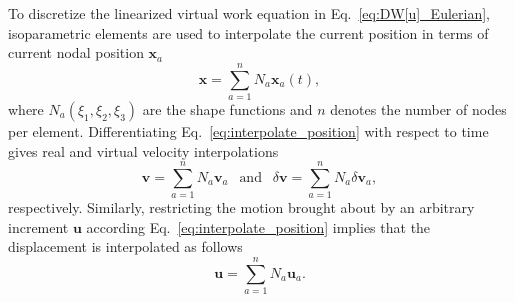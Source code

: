 \documentclass[12pt,aps,pre]{revtex4}
\begin{document}
To discretize the linearized virtual work equation in Eq.\ \eqref{eq:DW[u]_Eulerian}, isoparametric elements are used to interpolate the current position in terms of current nodal position $\pmb{x}_a$
%
\begin{equation}
\pmb{x} = \sum_{a=1}^n N_a \pmb{x}_a(t),
\label{eq:interpolate_position}
\end{equation}
% 
where $N_a(\xi_1,\xi_2,\xi_3)$ are the shape functions and $n$ denotes the number of nodes per element. Differentiating Eq.\ \eqref{eq:interpolate_position} with respect to time gives real and virtual velocity interpolations
%
\begin{equation}
\pmb{v} = \sum_{a=1}^n N_a \pmb{v}_a \ \ \text{ and } \ \ \delta \pmb{v} = \sum_{a=1}^n N_a \delta \pmb{v}_a,
\label{eq:interpolate_velocity}
\end{equation}
%
respectively.  Similarly, restricting the motion brought about by an arbitrary increment $\pmb{u}$ according Eq.\ \eqref{eq:interpolate_position} implies that the displacement is interpolated as follows
%
\begin{equation}
\pmb{u} = \sum_{a=1}^n N_a \pmb{u}_a.
\label{eq:interpolate_displacement}
\end{equation}
%
\end{document}
